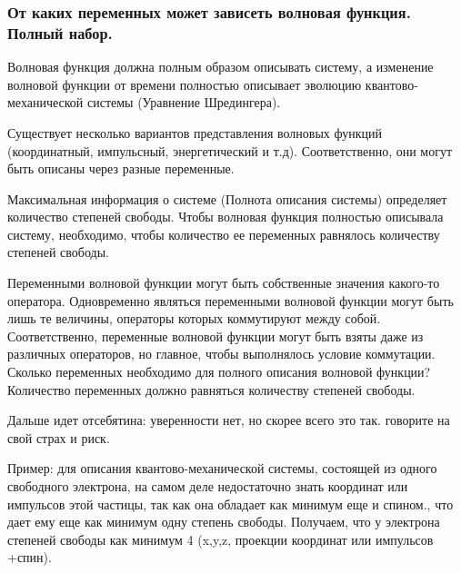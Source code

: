 \subsubsection{От каких переменных может зависеть волновая функция. Полный набор.}



Волновая функция должна полным образом описывать систему, а изменение волновой функции от времени полностью описывает эволюцию квантово-механической системы (Уравнение Шредингера). 

Существует несколько вариантов представления волновых функций (координатный, импульсный, энергетический и т.д). Соответственно, они могут быть описаны через разные переменные. 

Максимальная информация о системе (Полнота описания системы) определяет количество степеней свободы. Чтобы волновая функция полностью описывала систему, необходимо, чтобы количество ее переменных равнялось количеству степеней свободы. 

Переменными волновой функции могут быть собственные значения какого-то оператора. Одновременно являться переменными волновой функции могут быть лишь те величины, операторы которых коммутируют между собой. Соответственно, переменные волновой функции могут быть взяты даже из различных операторов, но главное, чтобы выполнялось условие коммутации. Сколько переменных необходимо для полного описания волновой функции? Количество переменных должно равняться количеству степеней свободы.

Дальше идет отсебятина: уверенности нет, но скорее всего это так. говорите на свой страх и риск. 

 Пример: для описания квантово-механической системы, состоящей из одного свободного электрона, на самом деле недостаточно знать координат или импульсов этой частицы, так как она обладает как минимум еще и спином., что дает ему еще как минимум одну степень свободы. Получаем, что у электрона степеней свободы как минимум 4 (x,y,z, проекции координат или импульсов +спин). 
